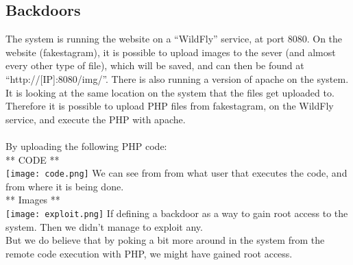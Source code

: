\subsection{Backdoors}


The system is running the website on a “WildFly” service, at port 8080. On the website (fakestagram), it is possible to upload images to the sever (and almost every other type of file), which will be saved, and can then be found at “http://[IP]:8080/img/”. There is also running a version of apache on the system. It is looking at the same location on the system that the files get uploaded to. \\
Therefore it is possible to upload PHP files from fakestagram, on the WildFly service, and execute the PHP with apache. \\ \\
By uploading the following PHP code:\\
** CODE ** \\
\texttt{[image: code.png]}
We can see from from what user that executes the code, and from where it is being done. \\
** Images **\\
\texttt{[image: exploit.png]}
If defining a backdoor as a way to gain root access to the system. Then we didn't manage to exploit any. \\
But we do believe that by poking a bit more around in the system from the remote code execution with PHP, we might have gained root access.